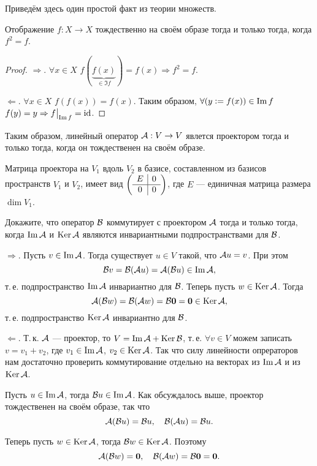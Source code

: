 Приведём здесь один простой факт из теории множеств.

\begin{proposal}
    Отображение $f: X \to X$ тождественно на своём образе тогда и только тогда, когда $f^2 = f$.
\end{proposal}

\begin{proof}
    $\Rightarrow$. $\forall x \in X$ $f(\underbrace{f(x)}_{{} \in \Im f}) = f(x) \Rightarrow f^2 = f$.

    $\Leftarrow$. $\forall x \in X$ $f(f(x)) = f(x)$. Таким образом, $\forall (y \vcentcolon = f(x)) \in \Im f$ $f(y) = y \Rightarrow f\big|_{\Im f} = \id$.
\end{proof}

Таким образом, линейный оператор $\A: V \to V$ явлется проектором тогда и только тогда, когда он тождественен на своём образе.

Матрица проектора на $V_1$ вдоль $V_2$ в базисе, составленном из базисов пространств $V_1$ и $V_2$, имеет вид
$
\br{
    \begin{array}{c | c}
        E & 0\\
        \hline
        0 & 0
    \end{array}
}
$, где $E$ --- единичная матрица размера $\dim V_1$.

\begin{problem}[А.\,А. Клячко]
    Докажите, что оператор $\B$ коммутирует с проектором $\A$ тогда и только тогда, когда $\Im\A$ и $\Ker\A$ являются инвариантными подпространствами для $\B$.
\end{problem}

\begin{solution}
    $\Rightarrow$. Пусть $v \in \Im\A$. Тогда существует $u \in V$ такой, что $\A u = v$. При этом
    \[
        \B v = \B(\A u) = \A(\B u) \in \Im\A,
    \]
    т.\,е. подпространство $\Im\A$ инвариантно для $\B$. Теперь пусть $w \in \Ker\A$. Тогда
    \[
        \A(\B w) = \B(\A w) = \B\bs{0} = \bs{0} \in \Ker\A,
    \]
    т.\,е. подпространство $\Ker\A$ инвариантно для $\B$.

    $\Leftarrow$. Т.\,к. $\A$ --- проектор, то $V = \Im\A + \Ker\B$, т.\,е. $\forall v \in V$ можем записать $v = v_1 + v_2$, где $v_1 \in \Im\A$, $v_2 \in \Ker\A$. Так что силу линейности опрераторов нам достаточно проверить коммутирование отдельно на векторах из $\Im\A$ и из $\Ker\A$.

    Пусть $u \in \Im\A$, тогда $\B u \in \Im\A$. Как обсуждалось выше, проектор тождественен на своём образе, так что
    \[
        \A(\B u) = \B u,\quad \B(\A u) = \B u.
    \]

    Теперь пусть $w \in \Ker\A$, тогда $\B w \in \Ker\A$. Поэтому
    \[
        \A(\B w) = \bs{0},\quad \B(\A w) = \B\bs{0} = \bs{0}.
    \]
\end{solution}

